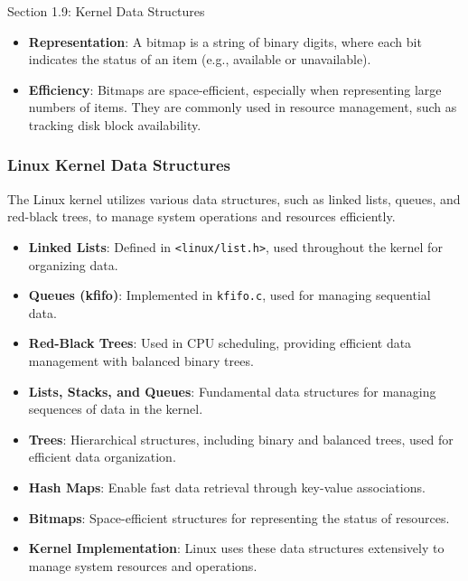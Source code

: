 \begin{notes}{Section 1.9: Kernel Data Structures}
    \begin{highlight}[Bitmaps]
    
    \begin{itemize}
        \item \textbf{Representation}: A bitmap is a string of binary digits, where each bit indicates the status of an item (e.g., available or unavailable).
        \item \textbf{Efficiency}: Bitmaps are space-efficient, especially when representing large numbers of items. They are commonly used in resource management, such as tracking disk block availability.
    \end{itemize}
    
    \end{highlight}
    
    \subsubsection*{Linux Kernel Data Structures}
    
    The Linux kernel utilizes various data structures, such as linked lists, queues, and red-black trees, to manage system operations and resources efficiently.
    
    \begin{highlight}
    
    \begin{itemize}
        \item \textbf{Linked Lists}: Defined in \texttt{<linux/list.h>}, used throughout the kernel for organizing data.
        \item \textbf{Queues (kfifo)}: Implemented in \texttt{kfifo.c}, used for managing sequential data.
        \item \textbf{Red-Black Trees}: Used in CPU scheduling, providing efficient data management with balanced binary trees.
    \end{itemize}
    
    \end{highlight}
    
    \begin{highlight}
    
    \begin{itemize}
        \item \textbf{Lists, Stacks, and Queues}: Fundamental data structures for managing sequences of data in the kernel.
        \item \textbf{Trees}: Hierarchical structures, including binary and balanced trees, used for efficient data organization.
        \item \textbf{Hash Maps}: Enable fast data retrieval through key-value associations.
        \item \textbf{Bitmaps}: Space-efficient structures for representing the status of resources.
        \item \textbf{Kernel Implementation}: Linux uses these data structures extensively to manage system resources and operations.
    \end{itemize}
    

\end{highlight}
\end{notes}
